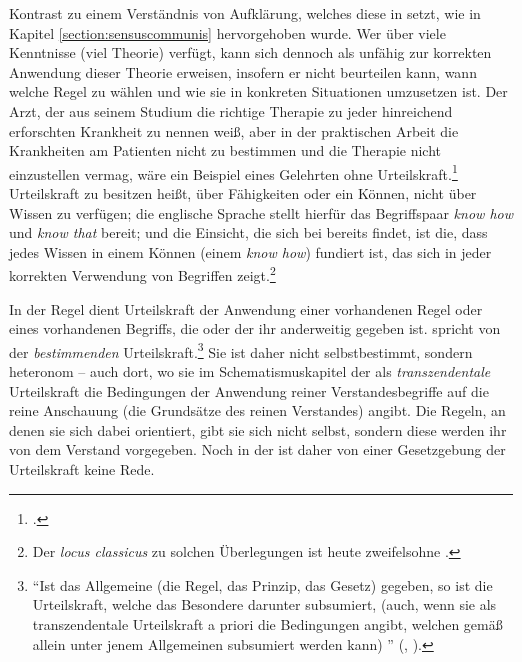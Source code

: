 \begin{nummerierung}
Kontrast zu einem Verständnis von Aufklärung, welches diese in
 setzt, wie in Kapitel
\ref{section:sensuscommunis} hervorgehoben wurde. Wer über viele
Kenntnisse (viel Theorie) verfügt, kann sich dennoch als unfähig zur korrekten
Anwendung dieser Theorie erweisen, insofern er nicht beurteilen kann, wann
welche Regel zu wählen und wie sie in konkreten Situationen umzusetzen ist.
Der Arzt, der aus seinem Studium die richtige Therapie zu jeder hinreichend
erforschten Krankheit zu nennen weiß, aber in der praktischen Arbeit die
Krankheiten am Patienten nicht zu bestimmen und die Therapie nicht einzustellen
vermag, wäre ein Beispiel eines Gelehrten ohne
Urteilskraft.\footnote{\cite[Vgl.][B
172\,f.,]{Kant:KritikderreinenVernunft2003}
\cite[][III: 132.2--10]{Kant:GesammelteWerke1900ff.}.} Urteilskraft zu besitzen
heißt, über Fähigkeiten oder ein Können, nicht über Wissen zu verfügen; die
englische Sprache stellt hierfür das Begriffspaar \emph{know how} und
\emph{know that} bereit; und die Einsicht, die sich bei 
bereits findet, ist die, dass jedes Wissen in einem Können (einem \emph{know
how}) fundiert ist, das sich in jeder korrekten Verwendung von Begriffen
zeigt.\footnote{Der \emph{locus classicus} zu solchen Überlegungen ist heute
zweifelsohne \cite[][Kap.~2]{Ryle:TheConceptofMind2002}.}

In der Regel dient Urteilskraft der Anwendung einer vorhandenen Regel oder
eines vorhandenen Begriffs, die oder der ihr anderweitig gegeben ist.
 spricht von der \emph{bestimmenden} Urteilskraft.\footnote{\enquote{Ist das Allgemeine (die
Regel, das Prinzip, das Gesetz) gegeben, so ist die Urteilskraft, welche das
Besondere darunter subsumiert, (auch, wenn sie als transzendentale
Urteilskraft a priori die Bedingungen angibt, welchen gemäß allein unter
jenem Allgemeinen subsumiert werden kann) }
\mkbibparens{\cite[][B xxvi]{Kant:KritikderUrteilskraft2009},
\cite[][V: 179.20--24]{Kant:GesammelteWerke1900ff.}}.} Sie ist daher nicht
selbstbestimmt, sondern heteronom -- auch dort, wo sie im
Schematismuskapitel der  als
\emph{transzendentale} Urteilskraft die Bedingungen der Anwendung reiner
Verstandesbegriffe auf die reine Anschauung (die Grundsätze des reinen
Verstandes) angibt. Die Regeln, an denen sie sich dabei orientiert, gibt sie
sich nicht selbst, sondern diese werden ihr von dem Verstand vorgegeben. Noch in
der  ist daher von einer Gesetzgebung der
Urteilskraft keine Rede.



\end{nummerierung}
